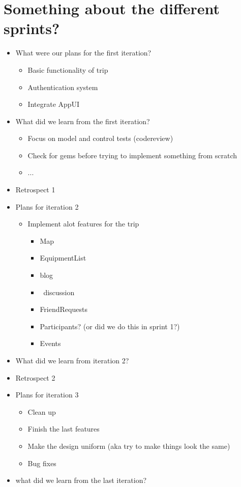 \documentclass[a4paper]{article}
\begin{document}
\section{Something about the different sprints?}
\begin{itemize}
  \item {What were our plans for the first iteration?
  \begin{itemize}
    \item {Basic functionality of trip}
    \item {Authentication system}
    \item {Integrate AppUI}
  \end{itemize}}
  \item {What did we learn from the first iteration?
  \begin{itemize}
    \item {Focus on model and control tests (codereview)}
    \item {Check for gems before trying to implement something from scratch}
    \item {...}
  \end{itemize}}
  \item {Retrospect 1}
  \item {Plans for iteration 2
  \begin{itemize}
    \item {Implement alot features for the trip
    \begin{itemize}
      \item {Map}
      \item {EquipmentList}
      \item {blog}
      \item {discussion}
      \item {FriendRequests}
      \item {Participants? (or did we do this in sprint 1?)}
      \item {Events}
    \end{itemize}}
  \end{itemize}}
  \item {What did we learn from iteration 2?}
  \item {Retrospect 2}
  \item {Plans for iteration 3
  \begin{itemize}
    \item {Clean up}
    \item {Finish the last features}
    \item {Make the design uniform (aka try to make things look the same)}
    \item {Bug fixes}
  \end{itemize}}
  \item {what did we learn from the last iteration?}
\end{itemize}
\end{document}
